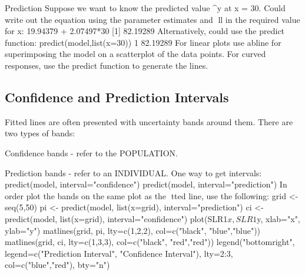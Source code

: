 Prediction
Suppose we want to know the predicted value ^y at x = 30. Could
write out the equation using the parameter estimates and ll in the
required value for x:
19.94379 + 2.07497*30
[1] 82.19289
Alternatively, could use the predict function:
predict(model,list(x=30))
1
82.19289
For linear plots use abline for superimposing the model on a
scatterplot of the data points. For curved responses, use the
predict function to generate the lines.

\subsection*{Confidence and Prediction Intervals}
Fitted lines are often presented with uncertainty bands around
them. There are two types of bands:
\item Confidence bands - refer to the POPULATION.
\item  Prediction bands - refer to an INDIVIDUAL.
One way to get intervals:
predict(model, interval="confidence")
predict(model, interval="prediction")
In order plot the bands on the same plot as the tted line, use the
following:
grid <- seq(5,50)
pi <- predict(model, list(x=grid), interval="prediction")
ci <- predict(model, list(x=grid), interval="confidence")
plot(SLR1$x, SLR1$y, xlab="x", ylab="y")
matlines(grid, pi, lty=c(1,2,2), col=c("black", "blue","blue"))
matlines(grid, ci, lty=c(1,3,3), col=c("black", "red","red"))
legend("bottomright", legend=c("Prediction Interval", "Confidence Interval"),
lty=2:3, col=c("blue","red"), bty="n")

